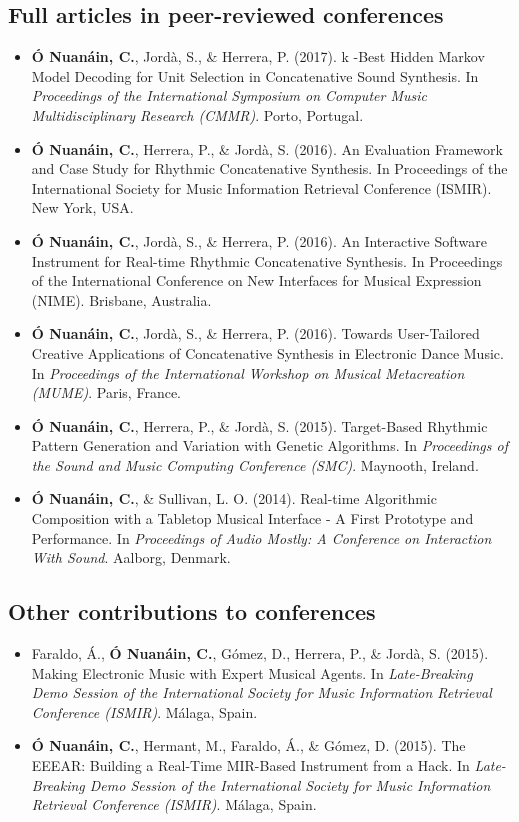 \subsection*{Full articles in peer-reviewed conferences}
\begin{itemize}[leftmargin=*]
	\item \textbf{Ó Nuanáin, C.}, Jordà, S., \& Herrera, P. (2017). k -Best Hidden Markov Model Decoding for Unit Selection in Concatenative Sound Synthesis. In \textit{Proceedings of the International Symposium on Computer Music Multidisciplinary Research (CMMR)}. Porto, Portugal.
	\item \textbf{Ó Nuanáin, C.}, Herrera, P., \& Jordà, S. (2016). An Evaluation Framework and Case Study for Rhythmic Concatenative Synthesis. In Proceedings of the International Society for Music Information Retrieval Conference (ISMIR). New York, USA.
	\item \textbf{Ó Nuanáin, C.}, Jordà, S., \& Herrera, P. (2016). An Interactive Software Instrument for Real-time Rhythmic Concatenative Synthesis. In Proceedings of the International Conference on New Interfaces for Musical Expression (NIME). Brisbane, Australia.
	\item \textbf{Ó Nuanáin, C.}, Jordà, S., \& Herrera, P. (2016). Towards User-Tailored Creative Applications of Concatenative Synthesis in Electronic Dance Music. In \textit{Proceedings of the International Workshop on Musical Metacreation (MUME)}. Paris, France.
	\item \textbf{Ó Nuanáin, C.}, Herrera, P., \& Jordà, S. (2015). Target-Based Rhythmic Pattern Generation and Variation with Genetic Algorithms. In \textit{Proceedings of the Sound and Music Computing Conference (SMC)}. Maynooth, Ireland.
	\item \textbf{Ó Nuanáin, C.}, \& Sullivan, L. O. (2014). Real-time Algorithmic Composition with a Tabletop Musical Interface - A First Prototype and Performance. In \textit{Proceedings of Audio Mostly: A Conference on Interaction With Sound}. Aalborg, Denmark.
\end{itemize}
%
\subsection*{Other contributions to conferences}
\begin{itemize}[leftmargin=*]
	\item Faraldo, Á., \textbf{Ó Nuanáin, C.}, Gómez, D., Herrera, P., \& Jordà, S. (2015). Making Electronic Music with Expert Musical Agents. In \textit{Late-Breaking Demo Session of the International Society for Music Information Retrieval Conference (ISMIR)}. Málaga, Spain.
	\item \textbf{Ó Nuanáin, C.}, Hermant, M., Faraldo, Á., \& Gómez, D. (2015). The EEEAR: Building a Real-Time MIR-Based Instrument from a Hack. In \textit{Late-Breaking Demo Session of the International Society for Music Information Retrieval Conference (ISMIR)}. Málaga, Spain.
\end{itemize}



